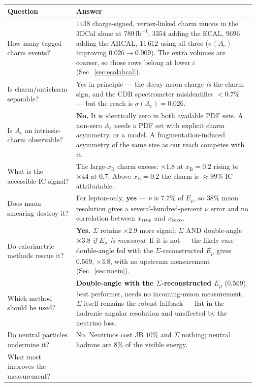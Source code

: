 \documentclass[11pt,a4paper]{article}
\newcommand{\xB}{x_{\mathrm{B}}}
\newcommand{\Ein}{E_{\mu}}
\newcommand{\fb}{\,\mathrm{fb}^{-1}}
\begin{document}
\begin{table}[htbp]
\centering\small
\begin{tabular}{p{6.3cm}p{8.6cm}}
\toprule
Question & Answer \\
\midrule
How many tagged charm events? &
$1438$ charge-signed, vertex-linked charm muons in the 3DCal alone at $780\fb$;
$3354$ adding the ECAL, $9696$ adding the AHCAL, $11\,612$ using all three
($\sigma(A_c)$ improving $0.026\to0.009$). The extra volumes are coarser, so
those rows belong at lower $\varepsilon$ (Sec.~\ref{sec:ecalahcal}). \\[3pt]
Is charm/anticharm separable? &
Yes in principle --- the decay-muon charge \emph{is} the charm sign, and the CDR
spectrometer misidentifies $<0.7\%$ --- but the reach is
$\sigma(A_c)=0.026$. \\[3pt]
Is $A_c$ an intrinsic-charm observable? &
\textbf{No.} It is identically zero in both available PDF sets. A non-zero
$A_c$ needs a PDF set with explicit charm asymmetry, or a model. A
fragmentation-induced asymmetry of the same size as our reach competes with
it. \\[3pt]
What is the accessible IC signal? &
The large-$\xB$ charm excess: $\times1.8$ at $\xB=0.2$ rising to $\times44$ at
$0.7$. Above $\xB=0.2$ the charm is $\approx99\%$ IC-attributable. \\[3pt]
Does muon smearing destroy it? &
For lepton-only, \textbf{yes} --- $\nu$ is $7.7\%$ of $\Ein$, so $38\%$ muon
resolution gives a several-hundred-percent $\nu$ error and no correlation
between $x_{\rm true}$ and $x_{\rm reco}$. \\[3pt]
Do calorimetric methods rescue it? &
\textbf{Yes.} $\Sigma$ retains $\times2.9$ more signal; $\Sigma$ AND
double-angle $\times3.8$ \emph{if $\Ein$ is measured}. If it is not ---
the likely case --- double-angle fed with the $\Sigma$-reconstructed $\Ein$
gives $0.569$, $\times3.8$, with no upstream measurement
(Sec.~\ref{sec:noein}). \\[3pt]
Which method should be used? &
\textbf{Double-angle with the $\Sigma$-reconstructed $\Ein$} ($0.569$): best
performer, needs no incoming-muon measurement. $\Sigma$ itself remains the
robust fallback --- flat in the hadronic angular resolution and unaffected by
the neutrino loss. \\[3pt]
Do neutral particles undermine it? &
No. Neutrinos cost JB $10\%$ and $\Sigma$ nothing; neutral hadrons are $8\%$ of
the visible energy. \\[3pt]
What most improves the measurement? &

\end{tabular}
\end{table}
\end{document}
